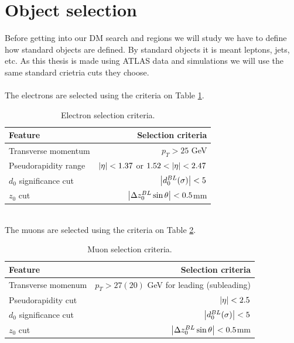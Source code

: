 \documentclass[14pt, a4paper]{book}
\begin{document}
\section{Object selection}\label{sec:obj_sel}
Before getting into our DM search and regions we will study we have to define how standard objects are defined. By standard objects it is meant leptons, jets, etc. As this thesis is made using ATLAS data and simulations we will use the same standard crietria 
cuts they choose.\\
\\The electrons are selected using the criteria on Table \ref{tab:E_selec}.
\begin{table}[!h]
    \centering\caption[Electron selection criteria]{Electron selection criteria.}
    \begin{tabular}{l|r}\midrule\midrule
        Feature                                                                 & Selection criteria        \\\midrule
        Transverse momentum                                                     & $p_T > 25$ GeV     \\
        Pseudorapidity range                                                    & $\abs{\eta}<1.37$ or  $1.52<\abs{\eta}<2.47$ \\
        $d_0$ significance cut                                                  & $\abs{d_0^{BL}(\sigma)}<5$    \\
        $z_0$ cut                                                               & $\abs{\Delta z_0^{BL}\sin\theta}<0.5$mm    \\\midrule\midrule
    \end{tabular}
    \label{tab:E_selec}
\end{table}
\\The muons are selected using the criteria on Table \ref{tab:mu_selec}.
\begin{table}[!h]
    \centering\caption[Muon selection criteria]{Muon selection criteria.}
    \begin{tabular}{l|r}\midrule\midrule
        Feature                                                                 & Selection criteria        \\\midrule
        Transverse momenum                                                      & $p_T > 27(20)$ GeV for leading (subleading)     \\
        Pseudorapidity cut                                                      & $\abs{\eta}<2.5$ \\
        $d_0$ significance cut                                                  & $\abs{d_0^{BL}(\sigma)}<5$    \\
        $z_0$ cut                                                               & $\abs{\Delta z_0^{BL}\sin\theta}<0.5$mm    \\\midrule\midrule
    \end{tabular}
    \label{tab:mu_selec}
\end{table}
\end{document}
